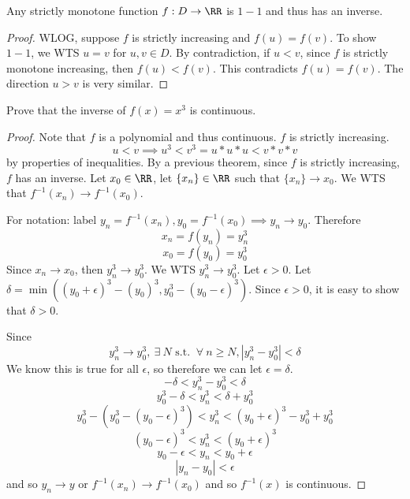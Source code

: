 \documentclass[12pt]{scrartcl}
\begin{document}
\begin{theorem}
  Any strictly monotone function $f: D \to \RR$ is $1-1$ and thus has an inverse. 

  \begin{proof}
    WLOG, suppose $f$ is strictly increasing and $f(u) = f(v)$. To show $1-1$, we WTS 
    $u = v$ for $u, v \in D$. By contradiction, if $u < v$, since $f$ is strictly monotone 
    increasing, then $f(u) < f(v)$. This contradicts $f(u) = f(v)$. The direction 
    $u > v$ is very similar. 
  \end{proof}
\end{theorem}

\begin{example}
  Prove that the inverse of $f(x) = x^3$ is continuous.

  \begin{proof}
    Note that $f$ is a polynomial and thus continuous. $f$ is strictly increasing. 
    \[u < v \implies u^3 < v^3 = u * u * u < v * v * v\]
    by properties of inequalities. By a previous theorem, since $f$ is strictly increasing, 
    $f$ has an inverse. Let $x_0 \in \RR$, let $\{x_n\}\in \RR$ such that $\{x_n\} \to x_0$. 
    We WTS that $f^{-1}(x_n) \to f^{-1}(x_0)$. 

    \hfill

    For notation: label $y_n = f^{-1}(x_n), y_0 = f^{-1}(x_0) \implies y_n \to y_0$. 
    Therefore
    \[x_n = f(y_n) = y_n^3 \]
    \[x_0 = f(y_0) = y_0^3\]
    Since $x_n \to x_0$, then $y_n^3 \to y_0^3$. We WTS $y_n^3 \to y_0^3$. Let $\epsilon > 0$. 
    Let $\delta = \min((y_0+\epsilon)^3 - (y_0)^3, y_0^3 - (y_0 - \epsilon)^3)$. Since $\epsilon > 0$, 
    it is easy to show that $\delta > 0$. 

    Since 
    \[y_n^3 \to y_0^3, \ \exists \ N \text{ s.t. } \ \forall \ n \geq N, |y_n^3 - y_0^3| < \delta\]
    We know this is true for all $\epsilon$, so therefore we can let $\epsilon = \delta$. 
    \[-\delta < y_n^3 - y_0^3 < \delta \]
    \[y_0^3 - \delta < y_n^3 < \delta + y_0^3\]
    \[y_0^3 - (y_0^3 - (y_0 - \epsilon)^3) < y_n^3 < (y_0 + \epsilon)^3 - y_0^3 + y_0^3\]
    \[(y_0 - \epsilon)^3  < y_n^3 < (y_0 + \epsilon)^3\]
    \[y_0 - \epsilon < y_n < y_0 + \epsilon\]
    \[|y_n - y_0| < \epsilon\]
    and so $y_n \to y$ or $f^{-1}(x_n) \to f^{-1}(x_0)$ and so $f^{-1}(x)$ is continuous.
  \end{proof}
\end{example}
\end{document}
